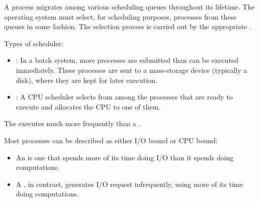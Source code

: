       \par A process migrates among various scheduling queues throughout its
        lifetime. The operating system must select, for scheduling purposes,
        processes from these queues in some fashion. The selection process is
        carried out by the appropriate .
      \par Types of scheduler:
      \begin{itemize}
        \item {}: In a batch system, more
          processes are submitted than can be executed immediately. These
          processes are sent to a mass-storage device (typically a disk), where
          they are kept for later execution.
        \item {}: A CPU scheduler selects
          from among the processes that are ready to execute and allocates the
          CPU to one of them.
      \end{itemize}
      \par The  executes much more frequently than a
        .

      \par Most processes can be described as either I/O bound or CPU bound:
      \begin{itemize}
        \item An  is one that spends more of its time
          doing I/O than it spends doing computations.
        \item A , in contrast, generates I/O request
          infrequently, using more of its time doing computations.
      \end{itemize}

